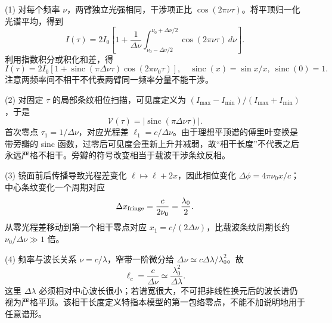 (1) 对每个频率 \(\nu\)，两臂独立光强相同，干涉项正比 \(\cos(2\pi\nu\tau)\)。将平顶归一化光谱平均，得到
\[
I(\tau)=2I_0\left[1+\frac1{\Delta\nu}\int_{\nu_0-\Delta\nu/2}^{\nu_0+\Delta\nu/2}\cos(2\pi\nu\tau)\,d\nu\right].
\]
利用指数积分或积化和差，得
\[
I(\tau)=2I_0[1+\operatorname{sinc}(\pi\Delta\nu\tau)\cos(2\pi\nu_0\tau)],
\quad \operatorname{sinc}(x)=\sin x/x,\ \operatorname{sinc}(0)=1.
\]
注意两频率间不相干不代表两臂同一频率分量不能干涉。

(2) 对固定 \(\tau\) 的局部条纹相位扫描，可见度定义为 \((I_{\max}-I_{\min})/(I_{\max}+I_{\min})\)，于是
\[
\mathcal V(\tau)=|\operatorname{sinc}(\pi\Delta\nu\tau)|.
\]
首次零点 \(\tau_1=1/\Delta\nu\)，对应光程差 \(\ell_1=c/\Delta\nu\)。由于理想平顶谱的傅里叶变换是带旁瓣的 sinc 函数，过零后可见度会重新上升并减弱，故“相干长度”不代表之后永远严格不相干。旁瓣的符号改变相当于载波干涉条纹反相。

(3) 镜面前后传播导致光程差变化 \(\ell\mapsto\ell+2x\)，因此相位变化 \(\Delta\phi=4\pi\nu_0x/c\)；中心条纹变化一个周期对应
\[
\Delta x_{\rm fringe}=\frac{c}{2\nu_0}=\frac{\lambda_0}{2}.
\]
从零光程差移动到第一个相干零点对应 \(x_1=c/(2\Delta\nu)\)，比载波条纹周期长约 \(\nu_0/\Delta\nu\gg1\) 倍。

(4) 频率与波长关系 \(\nu=c/\lambda\)，窄带一阶微分给 \(\Delta\nu\simeq c\Delta\lambda/\lambda_0^2\)。故
\[
\ell_c=\frac c{\Delta\nu}\simeq\frac{\lambda_0^2}{\Delta\lambda}.
\]
这里 \(\Delta\lambda\) 必须相对中心波长很小；若谱宽很大，不可把非线性换元后的波长谱仍视为严格平顶。该相干长度定义特指本模型的第一包络零点，不能不加说明地用于任意谱形。
